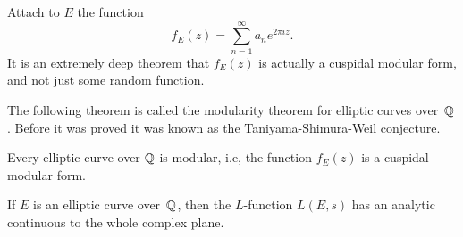 Attach to $E$ the function
$$
  f_E(z) = \sum_{n=1}^{\infty} a_n e^{2\pi i z}.
$$
It is an extremely deep theorem that $f_E(z)$ is actually
a cuspidal modular form, and not just some random function.


The following theorem is called the modularity theorem for elliptic
curves over~$\mathbb{Q}$.  Before it was proved it was known as the
Taniyama-Shimura-Weil conjecture.
\begin{theorem}
Every elliptic curve over $\mathbb{Q}$ is modular, i.e, the function
$f_E(z)$  is a cuspidal modular form.
\end{theorem}

\begin{corollary}[Hecke]
  If $E$ is an elliptic curve over~$\mathbb{Q}$, then the $L$-function
  $L(E,s)$ has an analytic continuous to the whole complex plane.
\end{corollary}



